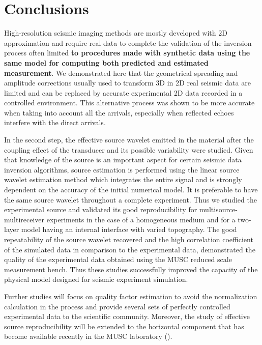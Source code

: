 \documentclass[extra,mreferee]{gji}
\begin{document}

\section{Conclusions}

High-resolution seismic imaging methods are mostly developed with 2D approximation and require real data to complete the validation of the inversion process often limited \textbf{to procedures made with synthetic data using the same model for computing both predicted and estimated measurement}. We demonstrated here that the geometrical spreading and amplitude corrections usually used to transform 3D in 2D real seismic data are limited and can be replaced by accurate experimental 2D data recorded in a controlled environment. This alternative process was shown to be more accurate when taking into account all the arrivals, especially when reflected echoes interfere with the direct arrivals.

In the second step, the effective source wavelet emitted in the material after the coupling effect of the transducer and its possible variability were studied. Given that knowledge of the source is an important aspect for certain seismic data inversion algorithms, source estimation is performed using the linear source wavelet estimation method which integrates the entire signal and is strongly dependent on the accuracy of the initial numerical model. It is preferable to have the same source wavelet throughout a complete experiment. Thus we studied the experimental source and validated its good reproducibility for multisource-multireceiver experiments in the case of a homogeneous medium and for a two-layer model having an internal interface with varied topography. The good repeatability of the source wavelet recovered and the high correlation coefficient of the simulated data in comparison to the experimental data, demonstrated the quality of the experimental data obtained using the MUSC reduced scale measurement bench. 
Thus these studies successfully improved the capacity of the physical model designed for seismic experiment simulation. 

Further studies will focus on quality factor estimation to avoid the normalization calculation in the process and provide several sets of perfectly controlled experimental data to the scientific community. Moreover, the study of effective source reproducibility will be extended to the horizontal component that has become available recently in the MUSC laboratory (\cite{valensi2015multicomponent}).
\end{document}

